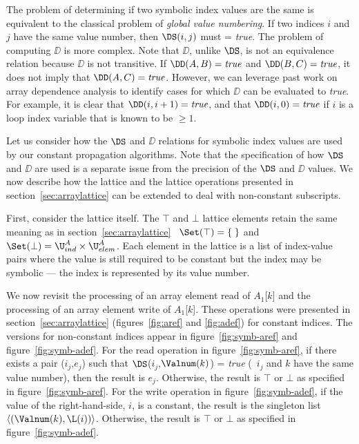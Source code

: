The problem of determining
if two symbolic index values are the same is equivalent to the
classical problem of {\it global value numbering}. If two indices $i$
and $j$ have the same value number, then $\DS(i,j)$ must = {\it true}.
The problem of computing
$\DD$ is more complex. Note that $\DD$, unlike $\DS$, is not an
equivalence relation because $\DD$ is not transitive.
If $\DD(A, B)=\mbox{\it true}$
and $\DD(B, C)=\mbox{\it true}$, it does
not imply that $\DD(A, C)=\mbox{\it true}$.  
However, we can leverage past work on array dependence analysis
to identify cases for which $\DD$ can be
evaluated to {\it true}.  For example, it is clear that $\DD(i,
i+1) = \mbox{\it true}$,
and that $\DD(i, 0) = \mbox{\it true}$ if $i$ is a loop index variable
that is known to be $\geq 1$.

Let us consider how the $\DS$ and $\DD$ relations for 
symbolic index values
are used by our constant
propagation algorithms.  Note that the specification of how $\DS$ and $\DD$
are used is a separate issue from the precision of
the $\DS$ and $\DD$ values.
We now describe how 
the lattice and the lattice operations presented in
section~\ref{sec:arraylattice} can be extended
to deal with non-constant subscripts.

First, consider the lattice itself. 
The 
$\top$ and $\bot$ lattice elements retain
the same meaning as in section~\ref{sec:arraylattice}
\viz\ $\Set(\top) = \{\;\}$ and 
$\Set(\bot) =  \U^A_{ind} \times \U^A_{elem}$.
Each element in the lattice is a list
of index-value pairs where the value is still required to
be constant but the index may be symbolic --- the index is
represented by its value number.

We now revisit the processing of an array element read of $A_1$[$k$] and
the processing of an array element write of $A_1$[$k$]. These
operations were presented in section~\ref{sec:arraylattice}
(figures~\ref{fig:aref} and \ref{fig:adef})
for constant indices. The versions for
non-constant indices appear in figure~\ref{fig:symb-aref} and
figure~\ref{fig:symb-adef}.
For the read operation in figure~\ref{fig:symb-aref}, if there exists a pair ($i_j$,$e_j$) such that
$\DS$($i_j$,$\Valnum(k)$) = {\it true} (\ie\ $i_j$ and $k$ have the
same value number), then the
result is $e_j$.  Otherwise, the result is $\top$ or $\bot$ as specified
in figure~\ref{fig:symb-aref}.
For the write operation in figure~\ref{fig:symb-adef}, if the value of the right-hand-side, $i$, is a constant, the result is the singleton list
$\langle(\Valnum(k),\L(i))\rangle$.  Otherwise, the result is $\top$ or $\bot$ as specified
in figure~\ref{fig:symb-adef}.

